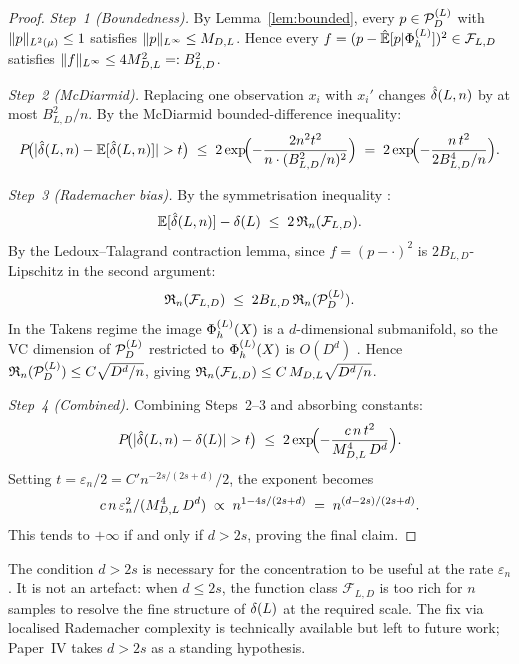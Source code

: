 \begin{proof}
\emph{Step~1 (Boundedness).}
By Lemma~\ref{lem:bounded}, every $p \in \mathcal{P}_D^{(L)}$ with $\|p\|_{L^{2}(\mu)} \leq 1$
satisfies $\|p\|_{L^{\infty}} \leq M_{D,L}$.
Hence every $f = (p - \hat{\mathbb{E}}[p|\Phi_h^{(L)}])^2 \in \mathcal{F}_{L,D}$ satisfies
$\|f\|_{L^{\infty}} \leq 4M_{D,L}^2 =: B_{L,D}^2$.

\emph{Step~2 (McDiarmid).}
Replacing one observation $x_i$ with $x_i'$ changes
$\hat{\delta}(L,n)$ by at most $B_{L,D}^2/n$.
By the McDiarmid bounded-difference inequality:
\[
  P\!\bigl(|\hat{\delta}(L,n) - \mathbb{E}[\hat{\delta}(L,n)]| > t\bigr)
  \;\leq\; 2\exp\!\Bigl(-\frac{2n^2 t^2}{n \cdot (B_{L,D}^2/n)^2}\Bigr)
  \;=\; 2\exp\!\Bigl(-\frac{n\,t^2}{2B_{L,D}^4/n}\Bigr).
\]

\emph{Step~3 (Rademacher bias).}
By the symmetrisation inequality \cite{BartlettMendelson2002}:
\[
  \mathbb{E}[\hat{\delta}(L,n)] - \delta(L)
  \;\leq\; 2\,\mathfrak{R}_n(\mathcal{F}_{L,D}).
\]
By the Ledoux--Talagrand contraction lemma, since $f = (p - \cdot)^2$ is
$2B_{L,D}$-Lipschitz in the second argument:
\[
  \mathfrak{R}_n(\mathcal{F}_{L,D})
  \;\leq\; 2B_{L,D}\,\mathfrak{R}_n(\mathcal{P}_D^{(L)}).
\]
In the Takens regime the image $\Phi_h^{(L)}(X)$ is a $d$-dimensional submanifold,
so the VC dimension of $\mathcal{P}_D^{(L)}$ restricted to $\Phi_h^{(L)}(X)$ is
$O(D^d)$ \cite{Gyorfi2002}.
Hence $\mathfrak{R}_n(\mathcal{P}_D^{(L)}) \leq C\sqrt{D^d/n}$, giving
$\mathfrak{R}_n(\mathcal{F}_{L,D}) \leq C\,M_{D,L}\sqrt{D^d/n}$.

\emph{Step~4 (Combined).}
Combining Steps~2--3 and absorbing constants:
\[
  P\!\bigl(|\hat{\delta}(L,n) - \delta(L)| > t\bigr)
  \;\leq\; 2\exp\!\Bigl(-\frac{c\,n\,t^2}{M_{D,L}^4\,D^d}\Bigr).
\]
Setting $t = \varepsilon_n/2 = C'n^{-2s/(2s+d)}/2$, the exponent becomes
\[
  c\,n\,\varepsilon_n^2 / (M_{D,L}^4\,D^d)
  \;\propto\; n^{1-4s/(2s+d)}
  \;=\; n^{(d-2s)/(2s+d)}.
\]
This tends to $+\infty$ if and only if $d > 2s$,
proving the final claim.
\end{proof}

\begin{remark}
\label{rem:d>2s}
The condition $d > 2s$ is necessary for the concentration to be useful at
the rate $\varepsilon_n$.
It is not an artefact: when $d \leq 2s$, the function class $\mathcal{F}_{L,D}$
is too rich for $n$ samples to resolve the fine structure of $\delta(L)$ at
the required scale.
The fix via localised Rademacher complexity \cite{BartlettBousquetMendelson2005}
is technically available but left to future work; Paper~IV takes $d > 2s$ as
a standing hypothesis.
\end{remark}


